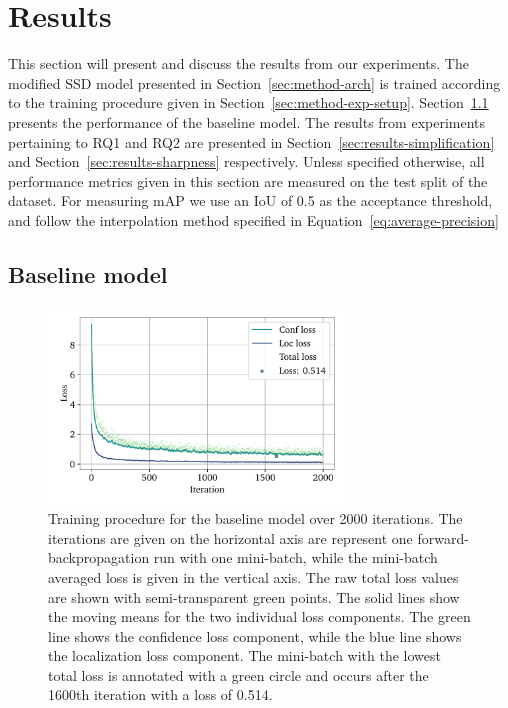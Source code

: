 \chapter{Results}\label{cha:results}

This section will present and discuss the results from our experiments.
The modified SSD model presented in Section~\ref{sec:method-arch} is trained according to the training procedure given in Section~\ref{sec:method-exp-setup}.
Section~\ref{sec:results-baseline} presents the performance of the baseline model. 
The results from experiments pertaining to RQ1 and RQ2 are presented in Section~\ref{sec:results-simplification} and Section~\ref{sec:results-sharpness} respectively.
Unless specified otherwise, all performance metrics given in this section are measured on the test split of the dataset.
For measuring mAP we use an IoU of 0.5 as the acceptance threshold, and follow the interpolation method specified in Equation~\ref{eq:average-precision}

\section{Baseline model}\label{sec:results-baseline}
\begin{figure}[htb]
    \centering
    \includegraphics[width=0.7\textwidth]{figs/method/baseline/loss2.pdf}
    \caption[Baseline training procedure]{%
Training procedure for the baseline model over 2000 iterations.
The iterations are given on the horizontal axis are represent one forward-backpropagation run with one mini-batch, while the mini-batch averaged loss is given in the vertical axis.
The raw total loss values are shown with semi-transparent green points.
The solid lines show the moving means for the two individual loss components.
The green line shows the confidence loss component, while the blue line shows the localization loss component.
The mini-batch with the lowest total loss is annotated with a green circle and occurs after the 1600th iteration with a loss of 0.514.
    }\label{fig:method-baseline-loss}
  \end{figure}


